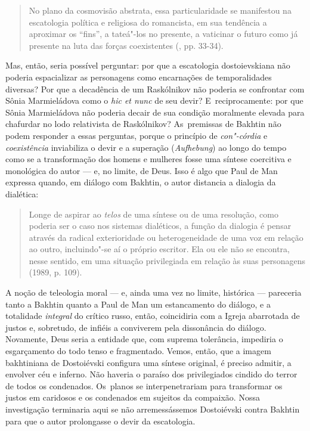 \begin{quote}
No plano da cosmovisão abstrata, essa particularidade se manifestou na
escatologia política e religiosa do romancista, em sua tendência a
aproximar os ``fins'', a tateá"-los no presente, a vaticinar o futuro
como já presente na luta das forças coexistentes (, pp. 33-34).
\end{quote}

Mas, então, seria possível perguntar: por que a escatologia
dostoievskiana não poderia espacializar as personagens como encarnações
de temporalidades diversas? Por que a decadência de um Raskólnikov não
poderia se confrontar com Sônia Marmieládova como o \emph{hic et nunc}
de seu devir? E~reciprocamente: por que Sônia Marmieládova não poderia
decair de sua condição moralmente elevada para chafurdar no lodo
relativista de Raskólnikov? As~premissas de Bakhtin não podem responder
a essas perguntas, porque o princípio de \emph{con"-córdia} e
\emph{coexistência} inviabiliza o devir e a superação (\emph{Aufhebung})
ao longo do tempo como se a transformação dos homens e mulheres fosse
uma síntese coercitiva e monológica do autor --- e, no limite, de Deus.
Isso é algo que Paul de Man expressa quando, em diálogo com Bakhtin, o
autor distancia a dialogia da dialética:

\begin{quote}
Longe de aspirar ao \emph{telos} de uma síntese ou de uma resolução,
como poderia ser o caso nos sistemas dialéticos, a função da dialogia é
pensar através da radical exterioridade ou heterogeneidade de uma voz em
relação ao outro, incluindo"-se aí o próprio escritor. Ela ou ele não se
encontra, nesse sentido, em uma situação privilegiada em relação às suas
personagens (1989, p. 109).
\end{quote}

A noção de teleologia moral --- e, ainda uma vez no limite, histórica ---
pareceria tanto a Bakhtin quanto a Paul de Man um estancamento do
diálogo, e a totalidade \emph{integral} do crítico russo, então,
coincidiria com a Igreja abarrotada de justos e, sobretudo, de infiéis a
conviverem pela dissonância do diálogo. Novamente, Deus seria a entidade
que, com suprema tolerância, impediria o esgarçamento do todo tenso e
fragmentado. Vemos, então, que a imagem bakhtiniana de Dostoiévski
configura uma síntese original, é preciso admitir, a envolver céu e
inferno. Não haveria o paraíso dos privilegiados cindido do terror de
todos os condenados. Os~planos se interpenetrariam para transformar os
justos em caridosos e os condenados em sujeitos da compaixão. Nossa
investigação terminaria aqui se não arremessássemos Dostoiévski contra
Bakhtin para que o autor prolongasse o devir da escatologia.


